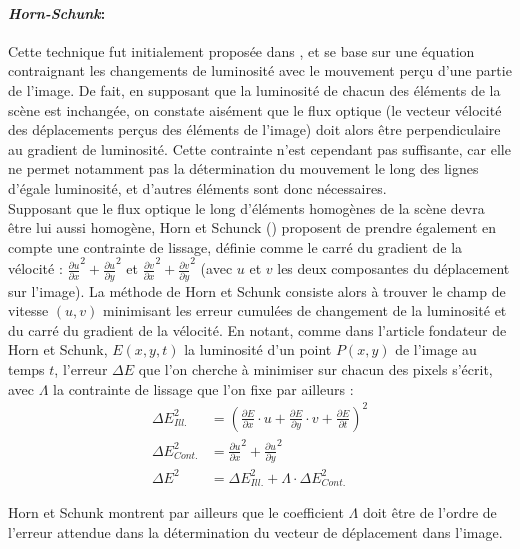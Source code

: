 \paragraph{\emph{Horn-Schunk}:\\}
Cette technique fut initialement proposée dans \cite{Horn1981}, et se base sur une équation contraignant les changements de luminosité avec le mouvement perçu d'une partie de l'image. De fait, en supposant que la luminosité de chacun des éléments de la scène est inchangée, on constate aisément que le flux optique (le vecteur vélocité des déplacements perçus des éléments de l'image) doit alors être perpendiculaire au gradient de luminosité. Cette contrainte n'est cependant pas suffisante, car elle ne permet notamment pas la détermination du mouvement le long des lignes d'égale luminosité, et d'autres éléments sont donc nécessaires. \\
Supposant que le flux optique le long d'éléments homogènes de la scène devra être lui aussi homogène, Horn et Schunck (\cite{Horn1981}) proposent de prendre également en compte une contrainte de lissage, définie comme le carré du gradient de la vélocité : ${\frac{\partial{u}}{\partial{x}}}^2 + {\frac{\partial{u}}{\partial{y}}}^2$ et  ${\frac{\partial{v}}{\partial{x}}}^2 + {\frac{\partial{v}}{\partial{y}}}^2$ (avec $u$ et $v$ les deux composantes du déplacement sur l'image). La méthode de Horn et Schunk consiste alors à trouver le champ de vitesse $(u,v)$ minimisant les erreur cumulées de changement de la luminosité et du carré du gradient de la vélocité. En notant, comme dans l'article fondateur de Horn et Schunk, $E(x,y,t)$ la luminosité d'un point $P(x,y)$ de l'image au temps $t$, l'erreur $\Delta E$ que l'on cherche à minimiser sur chacun des pixels s'écrit, avec $\Lambda$ la contrainte de lissage que l'on fixe par ailleurs :\\

\begin{align}
	{\Delta E}_{Ill.}^2 &= 	\left( \frac{\partial E}{\partial x} \cdot u + \frac{\partial E}{\partial y} \cdot v + \frac{\partial E}{\partial t} \right)^2 \\
	{\Delta E}_{Cont.}^2 &= {\frac{\partial{u}}{\partial{x}}}^2 + {\frac{\partial{u}}{\partial{y}}}^2 \\
	{\Delta E}^2 &= 				{\Delta E}_{Ill.}^2 + \Lambda \cdot {\Delta E}_{Cont.}^2
\end{align}

Horn et Schunk montrent par ailleurs que le coefficient $\Lambda$ doit être de l'ordre de l'erreur attendue dans la détermination du vecteur de déplacement dans l'image.

